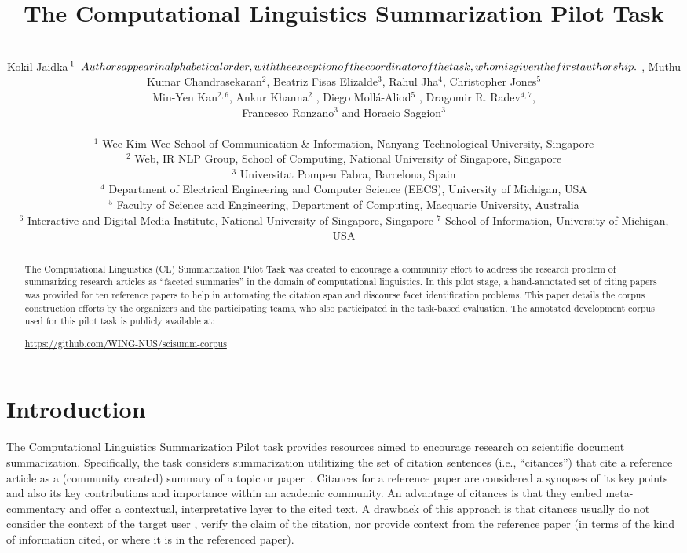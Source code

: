 \documentclass[11pt]{article}
\title{The Computational Linguistics Summarization Pilot Task}
\author{\\Kokil Jaidka$^{1}\relax{\hspace{.2cm}Authors appear in alphabetical order, with the exception of the coordinator of the task, whom is given the first authorship.} $ , Muthu Kumar Chandrasekaran$^{2}$, Beatriz Fisas Elizalde$^{3}$, Rahul Jha$^{4}$, Christopher Jones$^{5}$ \\ { Min-Yen Kan}$^{2,6}${, Ankur Khanna}$^{2}${ , Diego Moll\'{a}-Aliod}$^{5}${ , Dragomir R. Radev}$^{4,7}$, \\ { Francesco Ronzano}$^{3}$ and { Horacio Saggion}$^{3}$ \\ 
\\
$^1$ Wee Kim Wee School of Communication \& Information, Nanyang Technological University, Singapore \\
$^2$ Web, IR \/ NLP Group, School of Computing, National University of Singapore, Singapore \\
$^3$ Universitat Pompeu Fabra, Barcelona, Spain\\
$^4$ Department of Electrical Engineering and Computer Science (EECS), University of Michigan, USA\\
$^5$ Faculty of Science and Engineering, Department of Computing, Macquarie University, Australia\\
$^6$ Interactive and Digital Media Institute, National University of Singapore, Singapore
$^7$ School of Information, University of Michigan, USA}
\begin{document}
\maketitle
\begin{abstract}
The Computational Linguistics (CL) Summarization Pilot Task was created to encourage a community effort 
to address the research problem of summarizing research articles as ``faceted summaries'' in the domain 
of computational linguistics. In this pilot stage, a hand-annotated set of citing papers was provided for 
ten reference papers to help in automating the citation span and discourse facet identification problems.  
This paper details the corpus construction efforts by the organizers and the participating teams, who also 
participated in the task-based evaluation. The annotated development corpus used for this pilot task is 
publicly available at:
\begin{sloppypar}
\url{https://github.com/WING-NUS/scisumm-corpus}
\end{sloppypar}
\end{abstract}
\section{Introduction}

The Computational Linguistics Summarization Pilot task provides
resources aimed to encourage research on
scientific document summarization.  Specifically, the task considers
summarization utilitizing the set of citation sentences (i.e.,
``citances'') that cite a reference article as a (community created)
summary of a topic or
paper~\cite{nanba2011classification,qazvinian2010identifying}. Citances
for a reference paper are considered a synopses of its key points and
also its key contributions and importance within an academic
community. An advantage of citances is that they embed meta-commentary
and offer a contextual, interpretative layer to the cited text. A
drawback of this approach is that citances usually do not consider the
context of the target user
\cite{jones2007automatic,teufel2002summarizing}, verify the claim of
the citation, nor provide context from the reference paper (in terms of
the kind of information cited, or where it is in the referenced
paper).
\end{document}
